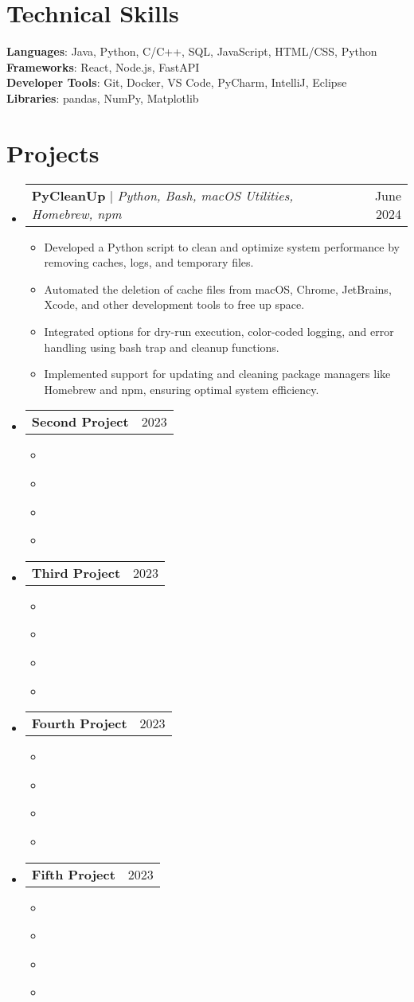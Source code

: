 \documentclass[letterpaper,11pt]{article}
\makeatletter
\newcommand{\resumeItem}[1]{
  \item\small{
    {#1 \vspace{-2pt}}
  }
}
\newcommand{\resumeProjectHeading}[2]{
    \item
    \begin{tabular*}{0.97\textwidth}{l@{\extracolsep{\fill}}r}
      \small#1 & #2 \\
    \end{tabular*}\vspace{0pt}
}
\newcommand{\resumeSubHeadingListStart}{\begin{itemize}[leftmargin=0.15in, label={}]}
\newcommand{\resumeSubHeadingListEnd}{\end{itemize}}
\newcommand{\resumeItemListStart}{\begin{itemize}}
\newcommand{\resumeItemListEnd}{\end{itemize}\vspace{-5pt}}
\makeatother
\begin{document}
\section{Technical Skills}
 \begin{itemize}[leftmargin=0.15in, label={}]
    \small{\item{
     \textbf{Languages}{: Java, Python, C/C++, SQL, JavaScript, HTML/CSS, Python} \\
     \textbf{Frameworks}{: React, Node.js, FastAPI} \\
     \textbf{Developer Tools}{: Git, Docker, VS Code, PyCharm, IntelliJ, Eclipse} \\
     \textbf{Libraries}{: pandas, NumPy, Matplotlib}
    }}



\section{Projects}
    \resumeSubHeadingListStart
        \resumeProjectHeading
        {\textbf{PyCleanUp} $|$ \emph{Python, Bash, macOS Utilities, Homebrew, npm}}{June 2024}
        \resumeItemListStart
        \resumeItem{Developed a Python script to clean and optimize system performance by removing caches, logs, and temporary files.}
        \resumeItem{Automated the deletion of cache files from macOS, Chrome, JetBrains, Xcode, and other development tools to free up space.}
        \resumeItem{Integrated options for dry-run execution, color-coded logging, and error handling using bash trap and cleanup functions.}
        \resumeItem{Implemented support for updating and cleaning package managers like Homebrew and npm, ensuring optimal system efficiency.}
    \resumeItemListEnd
    
      \resumeProjectHeading
          {\textbf{Second Project}}{2023}
          \resumeItemListStart
            \resumeItem {}
            \resumeItem{}
            \resumeItem{}
            \resumeItem{}
          \resumeItemListEnd
          
      \resumeProjectHeading
          {\textbf{Third Project}}{2023}
          \resumeItemListStart
            \resumeItem {}
            \resumeItem{}
            \resumeItem{}
            \resumeItem{}
          \resumeItemListEnd
          
     \resumeProjectHeading
          {\textbf{Fourth Project}}{2023}
          \resumeItemListStart
            \resumeItem {}
            \resumeItem{}
            \resumeItem{}
            \resumeItem{}
          \resumeItemListEnd
          
      \resumeProjectHeading
          {\textbf{Fifth Project}}{2023}
          \resumeItemListStart
            \resumeItem {}
            \resumeItem{}
            \resumeItem{}
            \resumeItem{}
          \resumeItemListEnd
    \resumeSubHeadingListEnd

 \end{itemize}
\end{document}
